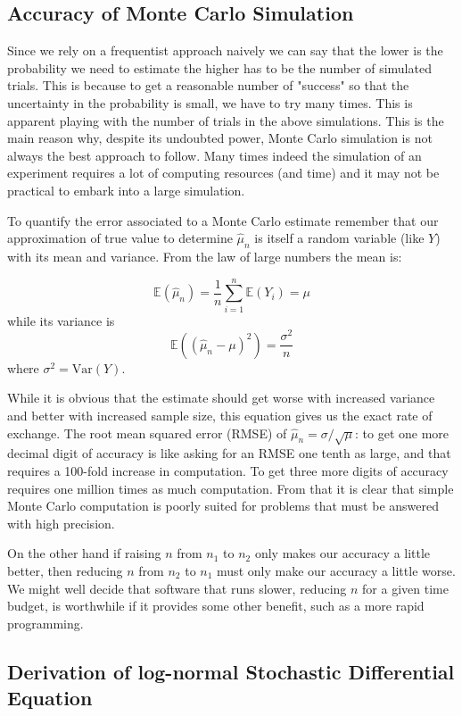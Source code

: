 \subsection{Accuracy of Monte Carlo Simulation}

Since we rely on a frequentist approach naively we can say that the lower is the probability we need to estimate the higher has to be the number of simulated trials. This is because to get a reasonable number of "success" so that the uncertainty in the probability is small, we have to try many times. This is apparent playing with the number of trials in the above simulations. 
This is the main reason why, despite its undoubted power, Monte Carlo simulation is not always the best approach to follow.
Many times indeed the simulation of an experiment requires a lot of computing resources (and time) and it may not be practical to embark into a large simulation.

To quantify the error associated to a Monte Carlo estimate remember that our approximation of true value to determine $\hat{\mu}_n$ is itself a random variable (like $Y$) with its mean and variance. From the law of large numbers the mean is:

\[\mathbb{E}(\hat{\mu}_n) = \frac{1}{n}\sum_{i=1}^{n}\mathbb{E}(Y_i)=\mu \]
while its variance is
\[\mathbb{E}((\hat{\mu}_n - \mu)^2)=\frac{\sigma^2}{n}\]
where $\sigma^2 = \mathrm{Var}(Y)$.

While it is obvious that the estimate should get worse with increased variance and better with increased sample size, this equation  gives us the exact rate of exchange. The root mean squared error (RMSE) of $\hat{\mu}_n = \sigma/\sqrt{\mu}$: to get one more decimal digit of accuracy is like asking for an RMSE one tenth as large, and that requires a 100-fold increase in computation. To get three more digits of accuracy requires one million times as much computation. From that it is clear that simple Monte Carlo
computation is poorly suited for problems that must be answered with high precision.

On the other hand if raising $n$ from $n_1$ to $n_2$ only makes our accuracy a little better, then reducing $n$ from $n_2$ to $n_1$ must only make our accuracy a little worse. We might well decide that software that runs slower, reducing $n$ for a given time budget, is worthwhile if it provides some other benefit, such as a more rapid programming.

 \subsection{Derivation of log-normal Stochastic Differential
Equation}\label{derivation-of-log-normal-stochastic-differential-equation}

